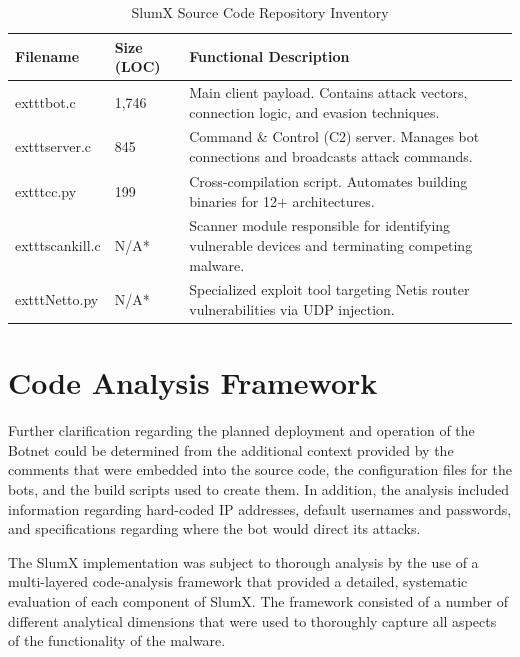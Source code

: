 \documentclass[12pt,letterpaper]{report}
\begin{document}
\begin{table}[htbp]
    \centering
    \caption{SlumX Source Code Repository Inventory}
    \label{tab:repo_inventory}
    \begin{tabularx}{\textwidth}{@{}l l X@{}}
        	{Filename} & \textbf{Size (LOC)} & \textbf{Functional Description} \\
        \midrule
        	exttt{bot.c} & 1,746 & Main client payload. Contains attack vectors, connection logic, and evasion techniques. \\
        \addlinespace
        	exttt{server.c} & 845 & Command \& Control (C2) server. Manages bot connections and broadcasts attack commands. \\
        \addlinespace
        	exttt{cc.py} & 199 & Cross-compilation script. Automates building binaries for 12+ architectures. \\
        \addlinespace
        	exttt{scankill.c} & N/A* & Scanner module responsible for identifying vulnerable devices and terminating competing malware. \\
        \addlinespace
        	exttt{Netto.py} & N/A* & Specialized exploit tool targeting Netis router vulnerabilities via UDP injection. \\
        \bottomrule
    \end{tabularx}
    \begin{minipage}{\textwidth}
        \footnotesize \vspace{1mm} 
    \end{minipage}
\end{table}

\section{Code Analysis Framework}

Further clarification regarding the planned deployment and operation of the Botnet could be determined from the additional context provided by the comments that were embedded into the source code, the configuration files for the bots, and the build scripts used to create them. In addition, the analysis included information regarding hard-coded IP addresses, default usernames and passwords, and specifications regarding where the bot would direct its attacks.

The SlumX implementation was subject to thorough analysis by the use of a multi-layered code-analysis framework that provided a detailed, systematic evaluation of each component of SlumX. The framework consisted of a number of different analytical dimensions that were used to thoroughly capture all aspects of the functionality of the malware.
\end{document}
